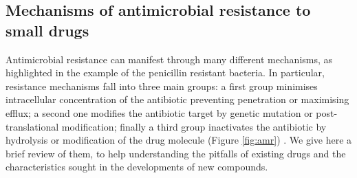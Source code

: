 \subsection{Mechanisms of antimicrobial resistance to small drugs} \label{sec:AMR_mechs}

Antimicrobial resistance can manifest through many different mechanisms, as highlighted in the example of the penicillin resistant bacteria.
%
In particular, resistance mechanisms fall into three main groups: a first group minimises intracellular concentration of the antibiotic preventing penetration or maximising efflux; a second one modifies the antibiotic target by genetic mutation or post-translational modification; finally a third group inactivates the antibiotic by hydrolysis or modification of the drug molecule (Figure \ref{fig:amr}) \cite{Blair2014}. We give here a brief review of them, to help understanding the pitfalls of existing drugs and the characteristics sought in the developments of new compounds.

